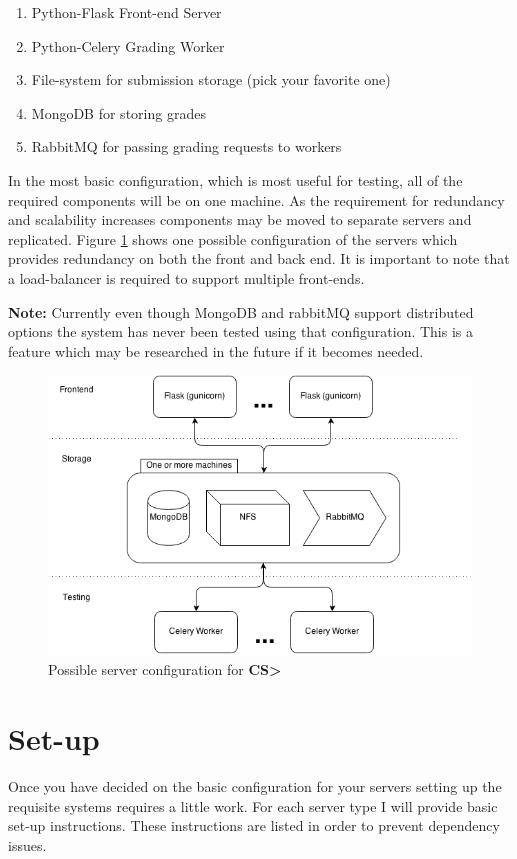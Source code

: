 \documentclass[11pt]{report}
\newcommand{\csgt}[0]{\textbf{CS\textgreater\ }}
\begin{document}
\begin{enumerate}
\item Python-Flask Front-end Server
\item Python-Celery Grading Worker
\item File-system for submission storage (pick your favorite one)
\item MongoDB for storing grades
\item RabbitMQ for passing grading requests to workers
\end{enumerate}

In the most basic configuration, which is most useful for testing, all of the required components will be
on one machine. As the requirement for redundancy and scalability increases components may be moved to
separate servers and replicated. Figure \ref{fig:layout} shows one possible configuration of the servers
which provides redundancy on both the front and back end. It is important to note that a load-balancer is
required to support multiple front-ends.

\textbf{Note:} Currently even though MongoDB and rabbitMQ support distributed options the system has never
been tested using that configuration. This is a feature which may be researched in the future if it becomes
needed.

\begin{figure}
\centering
\includegraphics[width=\textwidth,height=\textheight,keepaspectratio]{diagrams/HMC_Grader_Layout}
\caption{Possible server configuration for \csgt}
\label{fig:layout}
\end{figure}





\section{Set-up}
Once you have decided on the basic configuration for your servers setting up the requisite systems requires a
little work. For each server type I will provide basic set-up instructions. These instructions are listed in
order to prevent dependency issues.
\end{document}
